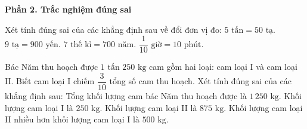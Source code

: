 \textbf{Phần 2. Trắc nghiệm đúng sai}

\begin{ex} %
Xét tính đúng sai của các khẳng định sau về đổi đơn vị đo:
\choiceTF
{\True $5\text{ tấn} = 50\text{ tạ}$.}
{$9\text{ tạ} = 900\text{ yến}$.}
{\True $7\text{ thế kỉ} = 700\text{ năm}$.}
{$\dfrac{1}{10}\text{ giờ} = 10\text{ phút}$.}
\end{ex}

\begin{ex} %
Bác Năm thu hoạch được $1\text{ tấn } 250\text{ kg}$ cam gồm hai loại: cam loại I và cam loại II. Biết cam loại I chiếm $\dfrac{3}{10}$ tổng số cam thu hoạch. Xét tính đúng sai của các khẳng định sau:
\choiceTF
{\True Tổng khối lượng cam bác Năm thu hoạch được là $1\,250\text{ kg}$.}
{Khối lượng cam loại I là $250\text{ kg}$.}
{\True Khối lượng cam loại II là $875\text{ kg}$.}
{\True Khối lượng cam loại II nhiều hơn khối lượng cam loại I là $500\text{ kg}$.}
\end{ex}

